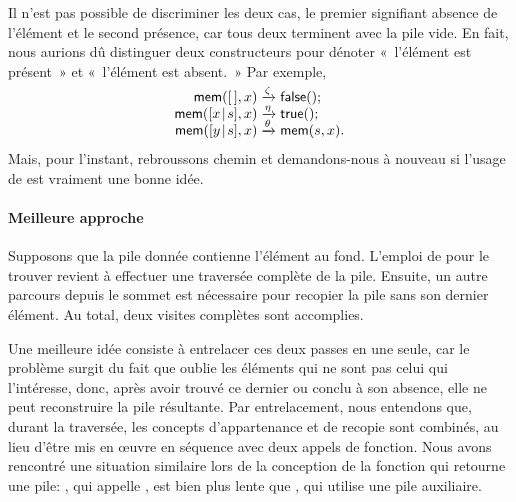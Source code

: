 Il n'est pas possible de discriminer les deux cas, le premier
signifiant absence de l'élément et le second présence, car tous deux
terminent avec la pile vide. En fait, nous aurions dû distinguer deux
constructeurs pour dénoter «~l'élément est présent~» et «~l'élément est
absent.~» Par exemple,
\begin{equation*}
\begin{array}{r@{\;}l@{\;}l}
\fun{mem}(\el,x)         & \smashedrightarrow{\zeta}  & \fun{false}();\\
\fun{mem}(\cons{x}{s},x) & \smashedrightarrow{\eta}   & \fun{true}();\\
\fun{mem}(\cons{y}{s},x) & \smashedrightarrow{\theta} & \fun{mem}(s,x).
\end{array}
\end{equation*}
Mais, pour l'instant, rebroussons chemin et demandons-nous à nouveau
si l'usage de  est vraiment une bonne idée.

\paragraph{Meilleure approche}

Supposons que la pile donnée contienne l'élément au fond. L'emploi de
 pour le trouver revient à effectuer une traversée complète
de la pile. Ensuite, un autre parcours depuis le sommet est nécessaire
pour recopier la pile sans son dernier élément. Au total, deux visites
complètes sont accomplies.

Une meilleure idée consiste à entrelacer ces deux passes en une seule,
car le problème surgit du fait que  oublie les éléments qui
ne sont pas celui qui l'intéresse, donc, après avoir trouvé ce dernier
ou conclu à son absence, elle ne peut reconstruire la pile
résultante. Par entrelacement, nous entendons que, durant la
traversée, les concepts d'appartenance et de recopie sont combinés, au
lieu d'être mis en {\oe}uvre en séquence avec deux appels de
fonction. Nous avons rencontré une situation similaire lors de la
conception de la fonction qui retourne une pile: , qui
appelle , est bien plus lente que , qui utilise
une pile auxiliaire.

